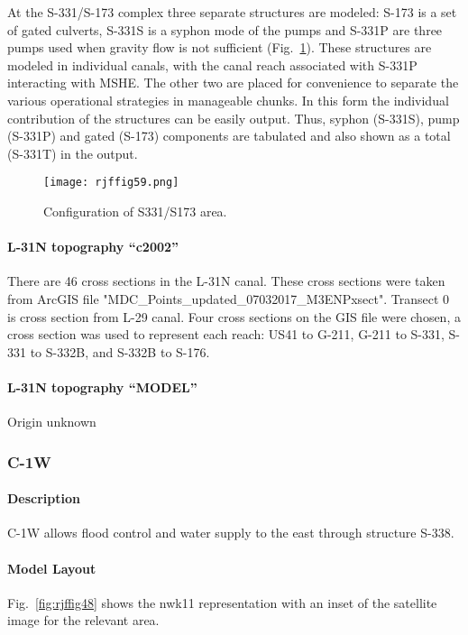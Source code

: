 At the S-331/S-173 complex three separate structures are modeled: S-173 is a set of gated culverts, S-331S is a syphon mode of the pumps and S-331P are three pumps used when gravity  flow is not sufficient (Fig.~\ref{fig:rjffig59}). These structures are modeled in individual canals, with the canal reach associated with S-331P interacting with MSHE. The other two are placed for convenience to separate the various operational strategies in manageable chunks. In this form the individual contribution of the structures can be easily output. Thus, syphon (S-331S), pump (S-331P) and gated (S-173) components are tabulated and also shown as a total (S-331T) in the output.

\begin{figure}[!h]
  \begin{center}
  \texttt{[image: rjffig59.png]}
  \caption{Configuration of S331/S173 area.}
  \label{fig:rjffig59}
  \end{center}
\end{figure}


\paragraph{L-31N topography ``c2002''}
There are 46 cross sections in the L-31N canal.  These cross sections were taken from ArcGIS file "MDC\_Points\_updated\_07032017\_M3ENPxsect".  Transect 0 is cross section from L-29 canal.  Four cross sections on the GIS file were chosen, a cross section was used to represent each reach: US41 to G-211, G-211 to S-331, S-331 to S-332B, and S-332B to S-176.

\paragraph{L-31N topography ``MODEL''}
Origin unknown

\clearpage
\subsubsection{C-1W}
\paragraph{Description}
C-1W allows flood control and water supply to the east through structure S-338.

\paragraph{Model Layout}
Fig.~\ref{fig:rjffig48} shows the nwk11 representation with an inset of the satellite image for the relevant area.

